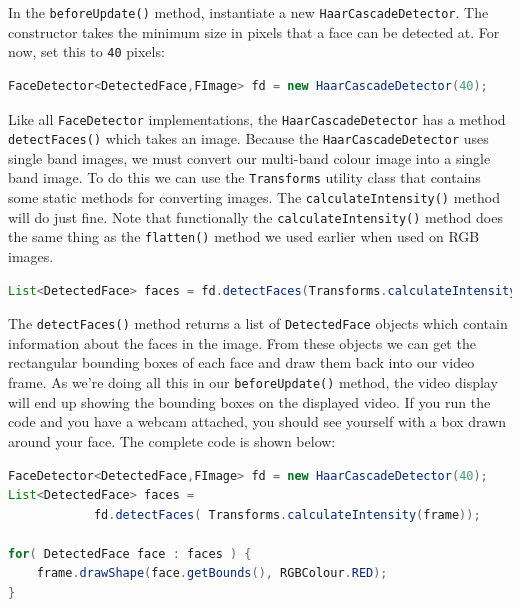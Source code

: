 \documentclass[10pt,a4paper,twoside,extrafontsizes]{memoir}
\begin{document}
In the \verb+beforeUpdate()+ method, instantiate a new \verb+HaarCascadeDetector+. The constructor takes 
the minimum size in pixels that a face can be detected at. For now, set this to \verb+40+ pixels:
\begin{lstlisting}[language=java]
FaceDetector<DetectedFace,FImage> fd = new HaarCascadeDetector(40);
\end{lstlisting}

Like all \verb+FaceDetector+ implementations, the \verb+HaarCascadeDetector+ has a method \verb+detectFaces()+
which takes an image. Because the \verb+HaarCascadeDetector+ uses single band images, we must convert 
our multi-band colour image into a single band image. To do this we can use the \verb+Transforms+ utility 
class that contains some static methods for converting images. The \verb+calculateIntensity()+ method 
will do just fine. Note that functionally the \verb+calculateIntensity()+ method does the same thing 
as the \verb+flatten()+ method we used earlier when used on RGB images.
\begin{lstlisting}[language=java]
List<DetectedFace> faces = fd.detectFaces(Transforms.calculateIntensity(frame));
\end{lstlisting}
The \verb+detectFaces()+ method returns a list of \verb+DetectedFace+ objects which contain 
information about the faces in the image. From these objects we can get the rectangular 
bounding boxes of each face and draw them back into our video frame. As we're doing all 
this in our \verb+beforeUpdate()+ method, the video display will end up showing the 
bounding boxes on the displayed video. If you run the code and you have a webcam attached,
you should see yourself with a box drawn around your face. The complete code is shown below:
\begin{lstlisting}[language=java]
FaceDetector<DetectedFace,FImage> fd = new HaarCascadeDetector(40);
List<DetectedFace> faces =
            fd.detectFaces( Transforms.calculateIntensity(frame));

for( DetectedFace face : faces ) {
    frame.drawShape(face.getBounds(), RGBColour.RED);
}
\end{lstlisting}
\end{document}
